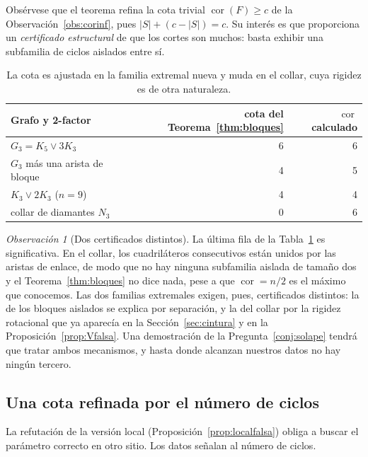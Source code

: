 \documentclass[11pt,a4paper]{article}
\theoremstyle{definition}
\theoremstyle{remark}
\newtheorem{observacion}[teorema]{Observación}
\begin{document}
Obsérvese que el teorema refina la cota trivial $\operatorname{cor}(F)\ge c$ de la Observación~\ref{obs:corinf}, pues $|S|+(c-|S|)=c$. Su interés es que proporciona un \emph{certificado estructural} de que los cortes son muchos: basta exhibir una subfamilia de ciclos aislados entre sí.

\begin{table}[h]
\centering
\begin{tabular}{lrr}
\toprule
Grafo y 2-factor & cota del Teorema~\ref{thm:bloques} & $\operatorname{cor}$ calculado\\
\midrule
$G_3=K_5\vee3K_3$ & 6 & 6\\
$G_3$ más una arista de bloque & 4 & 5\\
$K_3\vee2K_3$ ($n=9$) & 4 & 4\\
collar de diamantes $N_3$ & 0 & 6\\
\bottomrule
\end{tabular}
\caption{La cota es ajustada en la familia extremal nueva y muda en el collar, cuya rigidez es de otra naturaleza.}\label{tab:bloquescota}
\end{table}

\begin{observacion}[Dos certificados distintos]\label{obs:doscertificados}
La última fila de la Tabla~\ref{tab:bloquescota} es significativa. En el collar, los cuadriláteros consecutivos están unidos por las aristas de enlace, de modo que no hay ninguna subfamilia aislada de tamaño dos y el Teorema~\ref{thm:bloques} no dice nada, pese a que $\operatorname{cor}=n/2$ es el máximo que conocemos. Las dos familias extremales exigen, pues, certificados distintos: la de los bloques aislados se explica por separación, y la del collar por la rigidez rotacional que ya aparecía en la Sección~\ref{sec:cintura} y en la Proposición~\ref{prop:Vfalsa}. Una demostración de la Pregunta~\ref{conj:solape} tendrá que tratar ambos mecanismos, y hasta donde alcanzan nuestros datos no hay ningún tercero.
\end{observacion}


\subsection{Una cota refinada por el número de ciclos}\label{sub:refinada}

La refutación de la versión local (Proposición~\ref{prop:localfalsa}) obliga a buscar el parámetro correcto en otro sitio. Los datos señalan al número de ciclos.
\end{document}
